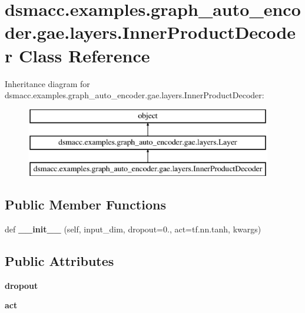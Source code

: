 \hypertarget{classdsmacc_1_1examples_1_1graph__auto__encoder_1_1gae_1_1layers_1_1InnerProductDecoder}{}\section{dsmacc.\+examples.\+graph\+\_\+auto\+\_\+encoder.\+gae.\+layers.\+Inner\+Product\+Decoder Class Reference}
\label{classdsmacc_1_1examples_1_1graph__auto__encoder_1_1gae_1_1layers_1_1InnerProductDecoder}
Inheritance diagram for dsmacc.\+examples.\+graph\+\_\+auto\+\_\+encoder.\+gae.\+layers.\+Inner\+Product\+Decoder\+:\begin{figure}[H]
\begin{center}
\leavevmode
\includegraphics[height=3.000000cm]{classdsmacc_1_1examples_1_1graph__auto__encoder_1_1gae_1_1layers_1_1InnerProductDecoder}
\end{center}
\end{figure}
\subsection*{Public Member Functions}
\begin{DoxyCompactItemize}
\item 
\mbox{\label{classdsmacc_1_1examples_1_1graph__auto__encoder_1_1gae_1_1layers_1_1InnerProductDecoder_a11e51221b164be4bb8cb53955e79824d}} 
def {\bfseries \+\_\+\+\_\+init\+\_\+\+\_\+} (self, input\+\_\+dim, dropout=0., act=tf.\+nn.\+tanh, kwargs)
\end{DoxyCompactItemize}
\subsection*{Public Attributes}
\begin{DoxyCompactItemize}
\item 
\mbox{\label{classdsmacc_1_1examples_1_1graph__auto__encoder_1_1gae_1_1layers_1_1InnerProductDecoder_a362cf98e7e76f6a578c868e446b5eb22}} 
{\bfseries dropout}
\item 
\mbox{\label{classdsmacc_1_1examples_1_1graph__auto__encoder_1_1gae_1_1layers_1_1InnerProductDecoder_a31fb9e289071be3808bff085a153e9c1}} 
{\bfseries act}
\end{DoxyCompactItemize}


